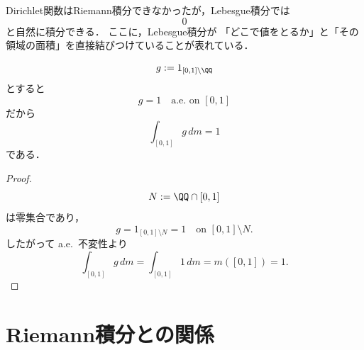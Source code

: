 \begin{remark}
Dirichlet関数はRiemann積分できなかったが，Lebesgue積分では
\[
0
\]
と自然に積分できる．
ここに，Lebesgue積分が
「どこで値をとるか」と「その領域の面積」を直接結びつけていることが表れている．
\end{remark}

\begin{example}
\[
g:=1_{[0,1]\setminus \QQ}
\]
とすると
\[
g=1 \quad \text{a.e.\ on } [0,1]
\]
だから
\[
\int_{[0,1]} g\,dm=1
\]
である．
\end{example}
\begin{proof}
\[
N:=\QQ \cap [0,1]
\]
は零集合であり，
\[
g=1_{[0,1]\setminus N}=1 \quad \text{on } [0,1]\setminus N.
\]
したがって a.e.\ 不変性より
\[
\int_{[0,1]} g\,dm
=
\int_{[0,1]} 1\,dm
=
m([0,1])=1.
\]
\end{proof}

\section{Riemann積分との関係}

